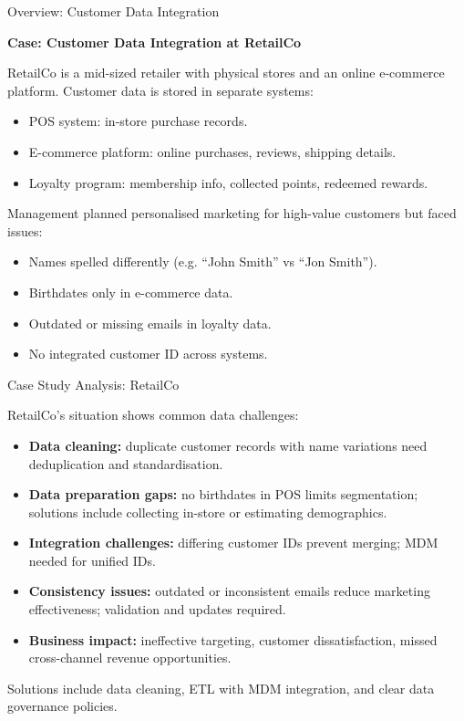 \documentclass[aspectratio=169, table]{beamer}
\begin{document}
\begin{frame}{Overview: Customer Data Integration}
	\vspace{20pt}
	
	\textbf{Case: Customer Data Integration at RetailCo}
	
	RetailCo is a mid-sized retailer with physical stores and an online e-commerce platform. Customer data is stored in separate systems:
	
	\begin{itemize}
		\item POS system: in-store purchase records.
		\item E-commerce platform: online purchases, reviews, shipping details.
		\item Loyalty program: membership info, collected points, redeemed rewards.
	\end{itemize}
	
	Management planned personalised marketing for high-value customers but faced issues:
	
	\begin{itemize}
		\item Names spelled differently (e.g. “John Smith” vs “Jon Smith”).
		\item Birthdates only in e-commerce data.
		\item Outdated or missing emails in loyalty data.
		\item No integrated customer ID across systems.
	\end{itemize}
	
\end{frame}

\begin{frame}{Case Study Analysis: RetailCo}
	\vspace{20pt}
	
	RetailCo’s situation shows common data challenges:
	
	\begin{itemize}
		\item \textbf{Data cleaning:} duplicate customer records with name variations need deduplication and standardisation.
		
		\item \textbf{Data preparation gaps:} no birthdates in POS limits segmentation; solutions include collecting in-store or estimating demographics.
		
		\item \textbf{Integration challenges:} differing customer IDs prevent merging; MDM needed for unified IDs.
		
		\item \textbf{Consistency issues:} outdated or inconsistent emails reduce marketing effectiveness; validation and updates required.
		
		\item \textbf{Business impact:} ineffective targeting, customer dissatisfaction, missed cross-channel revenue opportunities.
	\end{itemize}
	
	Solutions include data cleaning, ETL with MDM integration, and clear data governance policies.
	
\end{frame}
\end{document}
